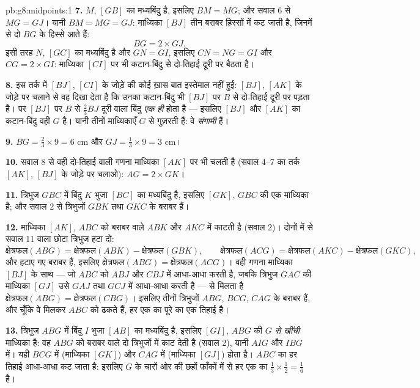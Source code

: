 \begin{solution}{pb:g8:midpoints:1}
\textbf{7.} $M$, $[GB]$ का मध्यबिंदु है, इसलिए $BM = MG$; और सवाल
6 से $MG = GJ$। यानी $BM = MG = GJ$: माध्यिका $[BJ]$ तीन बराबर
हिस्सों में कट जाती है, जिनमें से दो $BG$ के हिस्से आते हैं:
\[
BG = 2 \times GJ .
\]
इसी तरह $N$, $[GC]$ का मध्यबिंदु है और $GN = GI$, इसलिए
$CN = NG = GI$ और $CG = 2 \times GI$: माध्यिका $[CI]$ पर भी
कटान-बिंदु  से दो-तिहाई दूरी पर बैठता है।

\textbf{8.} इस तर्क में $[BJ]$, $[CI]$ के जोड़े की कोई ख़ास बात
इस्तेमाल नहीं हुई: $[BJ]$, $[AK]$ के जोड़े पर चलाने से वह दिखा देता
है कि उनका कटान-बिंदु भी $[BJ]$ पर $B$ से दो-तिहाई दूरी पर पड़ता
है। पर  $[BJ]$ पर $B$ से $\frac23 BJ$ दूरी वाला बिंदु
\emph{एक ही} होता है --- इसलिए $[BJ]$ और $[AK]$ का कटान-बिंदु वही
$G$ है। यानी तीनों माध्यिकाएँ $G$ से गुज़रती हैं: वे
\emph{संगामी} हैं।

\textbf{9.} $BG = \frac23 \times 9 = 6$ cm और
$GJ = \frac13 \times 9 = 3$ cm।

\textbf{10.} सवाल 8 से वही दो-तिहाई वाली गणना माध्यिका $[AK]$ पर
भी चलती है (सवाल 4--7 का तर्क $[AK]$, $[BJ]$ के जोड़े पर चलाओ):
$AG = 2 \times GK$।

\textbf{11.} त्रिभुज $GBC$ में बिंदु $K$ भुजा $[BC]$ का मध्यबिंदु
है, इसलिए $[GK]$, $GBC$ की एक माध्यिका है; और सवाल 2 से त्रिभुजों
$GBK$ तथा $GKC$ के  बराबर हैं।

\textbf{12.} माध्यिका $[AK]$, $ABC$ को बराबर  वाले $ABK$
और $AKC$ में काटती है (सवाल 2)। दोनों में से सवाल 11 वाला छोटा
त्रिभुज हटा दो:
\[
\text{क्षेत्रफल}(ABG) = \text{क्षेत्रफल}(ABK) - \text{क्षेत्रफल}(GBK),
\qquad
\text{क्षेत्रफल}(ACG) = \text{क्षेत्रफल}(AKC) - \text{क्षेत्रफल}(GKC),
\]
और हटाए गए  बराबर हैं, इसलिए
$\text{क्षेत्रफल}(ABG) = \text{क्षेत्रफल}(ACG)$। वही गणना माध्यिका
$[BJ]$ के साथ --- जो $ABC$ को $ABJ$ और $CBJ$ में आधा-आधा करती है,
जबकि त्रिभुज $GAC$ की माध्यिका $[GJ]$ उसे $GAJ$ तथा $GCJ$ में
आधा-आधा करती है --- से मिलता है
$\text{क्षेत्रफल}(ABG) = \text{क्षेत्रफल}(CBG)$। इसलिए तीनों
त्रिभुजों $ABG$, $BCG$, $CAG$ के  बराबर हैं, और चूँकि वे
मिलकर $ABC$ को ढकते हैं, हर एक का  पूरे का एक तिहाई है।

\textbf{13.} त्रिभुज $ABG$ में बिंदु $I$ भुजा $[AB]$ का मध्यबिंदु
है, इसलिए $[GI]$, $ABG$ की \emph{ $G$ से खींची} माध्यिका है:
वह $ABG$ को बराबर  वाले दो त्रिभुजों में काट देती है
(सवाल 2), यानी $AIG$ और $IBG$ में। यही $BCG$ में (माध्यिका
$[GK]$) और $CAG$ में (माध्यिका $[GJ]$) होता है। $ABC$ का हर तिहाई
आधा-आधा कट जाता है: इसलिए $G$ के चारों ओर की छहों फाँकों में से हर
एक का  $\frac13 \times \frac12 = \frac16$ है।


\end{solution}
